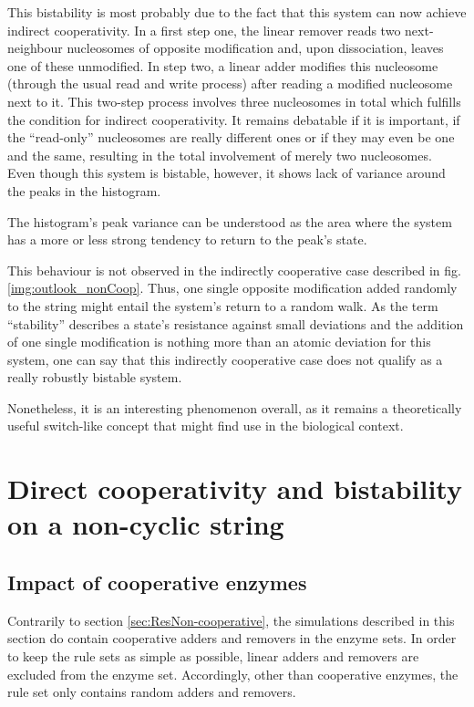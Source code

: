             This bistability is most probably due to the fact that this system can now achieve indirect cooperativity. In a first step one, the linear remover reads two next-neighbour nucleosomes of opposite modification and, upon dissociation, leaves one of these unmodified. In step two, a linear adder modifies this nucleosome (through the usual read and write process) after reading a modified nucleosome next to it. This two-step process involves three nucleosomes in total which fulfills the condition for indirect cooperativity. It remains debatable if it is important, if the “read-only” nucleosomes are really different ones or if they may even be one and the same, resulting in the total involvement of merely two nucleosomes.\\

            Even though this system is bistable, however, it shows lack of variance around the peaks in the histogram.

            The histogram's peak variance can be understood as the area where the system has a more or less strong tendency to return to the peak's state.

            This behaviour is not observed in the indirectly cooperative case described in fig. \ref{img:outlook_nonCoop}. Thus, one single opposite modification added randomly to the string might entail the system's return to a random walk. As the term “stability” describes a state's resistance against small deviations and the addition of one single modification is nothing more than an atomic deviation for this system, one can say that this indirectly cooperative case does not qualify as a really robustly bistable system.

            Nonetheless, it is an interesting phenomenon overall, as it remains a theoretically useful switch-like concept that might find use in the biological context.
    \clearpage
    \section{Direct cooperativity and bistability on a non-cyclic string}
        \label{sec:ResNonCyc}
        \subsection{Impact of cooperative enzymes}
            \label{subsec:impactOfCooperativeEnzymes}
            Contrarily to section \ref{sec:ResNon-cooperative}, the simulations described in this section do contain cooperative adders and removers in the enzyme sets. In order to keep the rule sets as simple as possible, linear adders and removers are excluded from the enzyme set. Accordingly, other than cooperative enzymes, the rule set only contains random adders and removers.

